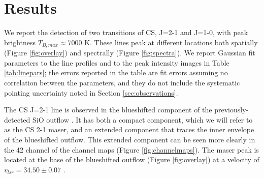 \documentclass[twocolumn]{aastex62}
\begin{document}

\section{Results}
We report the detection of two transitions of CS, J=2-1 and J=1-0, with
peak brightness $T_{B,max}\approx7000$ K.
These lines peak at different locations both spatially (Figure
\ref{fig:overlay}) and spectrally (Figure \ref{fig:spectra}).
We report Gaussian fit parameters to the line profiles and to the peak intensity
images in Table \ref{tab:linepars}; the errors reported in the table are fit
errors assuming no correlation between the parameters, and they do not include
the systematic pointing uncertainty noted in Section \ref{sec:observations}.

The CS J=2-1 line is observed in the blueshifted component of the
previously-detected SiO outflow \citep{Goddi2018a}.
It has both a compact component, which we will refer to as the CS 2-1 maser,
and an extended component that traces the inner envelope of the blueshifted
outflow.  This extended component can be seen more clearly in the 42 \kms
channel of the channel maps (Figure \ref{fig:channelmaps}).  The maser
peak is located at the base of the blueshifted outflow (Figure
\ref{fig:overlay}) at a velocity of $v_{lsr}=34.50\pm0.07$ \kms.
\end{document}
